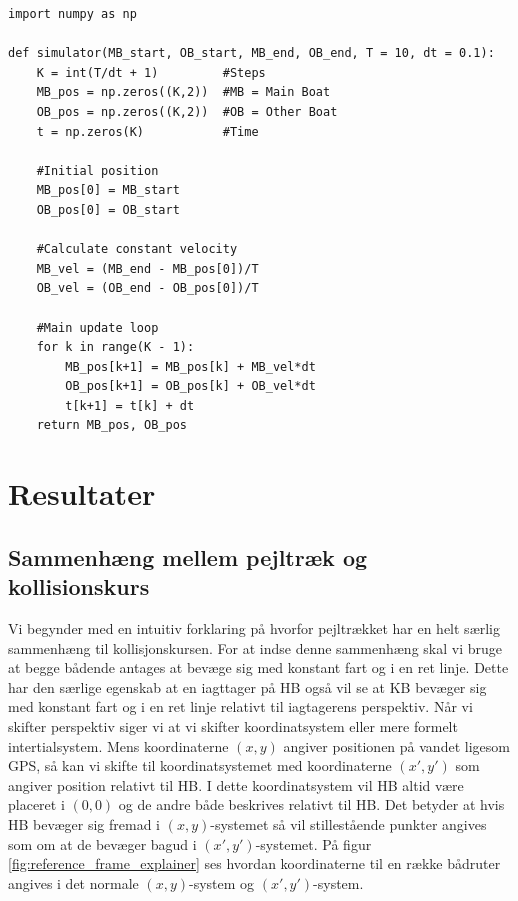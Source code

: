\documentclass[%
 reprint,
nofootinbib,
aps,
]{revtex4-1}
\begin{document}
\begin{verbatim}
import numpy as np

def simulator(MB_start, OB_start, MB_end, OB_end, T = 10, dt = 0.1):
    K = int(T/dt + 1)         #Steps
    MB_pos = np.zeros((K,2))  #MB = Main Boat
    OB_pos = np.zeros((K,2))  #OB = Other Boat
    t = np.zeros(K)           #Time

    #Initial position
    MB_pos[0] = MB_start
    OB_pos[0] = OB_start

    #Calculate constant velocity
    MB_vel = (MB_end - MB_pos[0])/T
    OB_vel = (OB_end - OB_pos[0])/T

    #Main update loop
    for k in range(K - 1):
        MB_pos[k+1] = MB_pos[k] + MB_vel*dt
        OB_pos[k+1] = OB_pos[k] + OB_vel*dt
        t[k+1] = t[k] + dt
    return MB_pos, OB_pos
\end{verbatim}


\section{Resultater}
\subsection{Sammenhæng mellem pejltræk og kollisionskurs}
Vi begynder med en intuitiv forklaring på hvorfor pejltrækket har en helt særlig sammenhæng til kollisjonskursen. For at indse denne sammenhæng skal vi bruge at begge bådende antages at bevæge sig med konstant fart og i en ret linje. Dette har den særlige egenskab at en iagttager på HB også vil se at KB bevæger sig med konstant fart og i en ret linje relativt til iagtagerens perspektiv. Når vi skifter perspektiv siger vi at vi skifter koordinatsystem eller mere formelt intertialsystem. Mens koordinaterne $(x, y)$ angiver positionen på vandet ligesom GPS, så kan vi skifte til koordinatsystemet med koordinaterne $(x',y')$ som angiver position relativt til HB. I dette koordinatsystem vil HB altid være placeret i $(0,0)$ og de andre både beskrives relativt til HB. Det betyder at hvis HB bevæger sig fremad i $(x,y)$-systemet så vil stillestående punkter angives som om at de bevæger bagud i $(x',y')$-systemet. På figur \ref{fig:reference_frame_explainer} ses hvordan koordinaterne til en række bådruter angives i det normale $(x,y)$-system og $(x',y')$-system.
\end{document}
